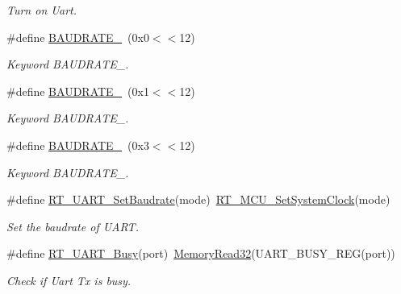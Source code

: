 \begin{DoxyCompactItemize}
\begin{DoxyCompactList}\small\item\em Turn on Uart. \end{DoxyCompactList}\item 
\mbox{\label{a00098_a89d72bee69b33d0404d33f47608d16f0}} 
\#define \mbox{\hyperlink{a00098_a89d72bee69b33d0404d33f47608d16f0}{B\+A\+U\+D\+R\+A\+T\+E\+\_}}~(0x0$<$$<$12)
\begin{DoxyCompactList}\small\item\em Keyword B\+A\+U\+D\+R\+A\+T\+E\+\_. \end{DoxyCompactList}\item 
\mbox{\label{a00098_ab94a89ecf1976f304764aec119e215e7}} 
\#define \mbox{\hyperlink{a00098_ab94a89ecf1976f304764aec119e215e7}{B\+A\+U\+D\+R\+A\+T\+E\+\_}}~(0x1$<$$<$12)
\begin{DoxyCompactList}\small\item\em Keyword B\+A\+U\+D\+R\+A\+T\+E\+\_. \end{DoxyCompactList}\item 
\mbox{\label{a00098_a9c74d2185a532185624b8dc3086f8e3e}} 
\#define \mbox{\hyperlink{a00098_a9c74d2185a532185624b8dc3086f8e3e}{B\+A\+U\+D\+R\+A\+T\+E\+\_}}~(0x3$<$$<$12)
\begin{DoxyCompactList}\small\item\em Keyword B\+A\+U\+D\+R\+A\+T\+E\+\_. \end{DoxyCompactList}\item 
\#define \mbox{\hyperlink{a00098_a565befb27caf782083358e0ad81af3a3}{R\+T\+\_\+\+U\+A\+R\+T\+\_\+\+Set\+Baudrate}}(mode)~\mbox{\hyperlink{a00026_a017f8665ec51267680fc0e536db19c13}{R\+T\+\_\+\+M\+C\+U\+\_\+\+Set\+System\+Clock}}(mode)
\begin{DoxyCompactList}\small\item\em Set the baudrate of U\+A\+RT. \end{DoxyCompactList}\item 
\#define \mbox{\hyperlink{a00098_a3ab834a97a200601f16b923a705f3f01}{R\+T\+\_\+\+U\+A\+R\+T\+\_\+\+Busy}}(port)~\mbox{\hyperlink{a00026_a2d484dc15bdf30ee11ab3b05f31f0e16}{Memory\+Read32}}(U\+A\+R\+T\+\_\+\+B\+U\+S\+Y\+\_\+\+R\+EG(port))
\begin{DoxyCompactList}\small\item\em Check if Uart Tx is busy. \end{DoxyCompactList}\item 
$$
\end{DoxyCompactItemize}
